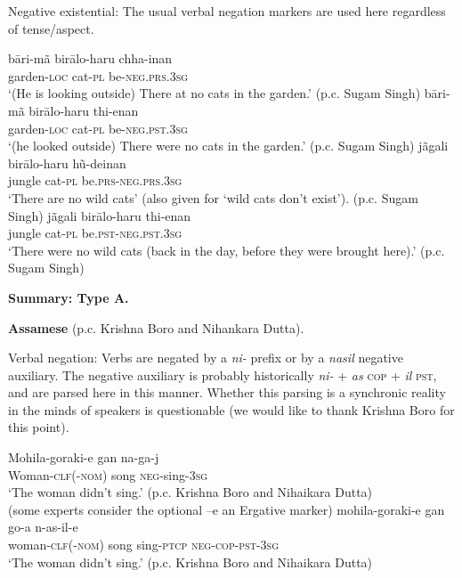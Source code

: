 ﻿\documentclass[output=paper]{langsci/langscibook}
\begin{document}
\begin{unindented}
Negative existential: The usual verbal negation markers are used here regardless of tense/aspect.
%
\begin{exe}\ex \gll bāri-mã birālo-haru  chha-inan \\
garden-\textsc{loc} cat-\textsc{pl} be-\textsc{neg.prs.3sg} \\
    \glt `(He is looking outside) There at no cats in the garden.' (p.c. Sugam Singh)
\ex \gll bāri-mã birālo-haru  thi-enan \\
garden-\textsc{loc} cat-\textsc{pl} be-\textsc{neg.pst.3sg} \\
    \glt `(he looked outside) There were no cats in the garden.' (p.c. Sugam Singh)
\ex \gll jãgali birālo-haru hũ-deinan \\
jungle cat-\textsc{pl} be.\textsc{prs-neg.prs.3sg} \\
    \glt `There are no wild cats' (also given for `wild cats don't exist’). (p.c. Sugam Singh)
\ex \gll jãgali birālo-haru thi-enan \\
jungle cat-\textsc{pl} be.\textsc{pst-neg.pst.3sg} \\
    \glt `There were no wild cats (back in the day, before they were brought here).' (p.c. Sugam Singh)
    \end{exe} 

\textbf{Summary: Type A.}

\textbf{Assamese} (p.c. Krishna Boro and Nihankara Dutta).

Verbal negation: Verbs are negated by a \textit{ni-} prefix or by a
\textit{nasil} negative auxiliary. The negative auxiliary is probably
historically \textit{ni-} + \textit{as} \textsc{cop} + \textit{il}
\textsc{pst}, and are parsed here in this manner. Whether this parsing is a synchronic reality in the minds of speakers is questionable (we would like to thank Krishna Boro for this point).
%
\begin{exe}\ex \gll Mohila-goraki{\op}-e{\cp} gan na-ga-j \\
Woman-\textsc{clf(-nom)}  song \textsc{neg}-sing-\textsc{3sg} \\
    \glt `The woman didn't sing.' (p.c. Krishna Boro and Nihaikara Dutta)
\\
(some experts consider the optional –e an Ergative marker)
\ex \gll mohila-goraki{\op}-e{\cp} gan  go-a n-as-il-e \\
woman-\textsc{clf}(-\textsc{nom}) song sing-\textsc{ptcp} \textsc{neg-cop-pst-3sg} \\
    \glt `The woman didn't sing.' (p.c. Krishna Boro and Nihaikara Dutta)
    \end{exe}


\end{unindented}
\end{document}
